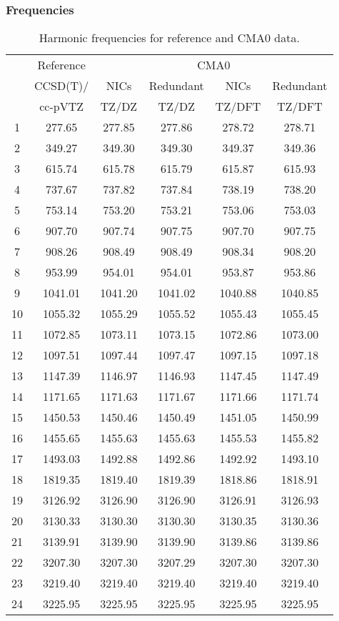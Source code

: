 \documentclass[10pt,oneside]{article}
\begin{document}
\begin{table}[h!]
\subsubsection*{Frequencies}
\centering
\caption{Harmonic frequencies for reference and CMA0 data.}
\begin{tabular}{cccccc}
\toprule
{} & Reference & \multicolumn{4}{c}{CMA0} \\
{} &  CCSD(T)/ &    NICs &  Redundant &    NICs & Redundant \\
{} &   cc-pVTZ &   TZ/DZ &      TZ/DZ &  TZ/DFT &    TZ/DFT \\
\midrule
1  &    277.65 &  277.85 &     277.86 &  278.72 &    278.71 \\
2  &    349.27 &  349.30 &     349.30 &  349.37 &    349.36 \\
3  &    615.74 &  615.78 &     615.79 &  615.87 &    615.93 \\
4  &    737.67 &  737.82 &     737.84 &  738.19 &    738.20 \\
5  &    753.14 &  753.20 &     753.21 &  753.06 &    753.03 \\
6  &    907.70 &  907.74 &     907.75 &  907.70 &    907.75 \\
7  &    908.26 &  908.49 &     908.49 &  908.34 &    908.20 \\
8  &    953.99 &  954.01 &     954.01 &  953.87 &    953.86 \\
9  &   1041.01 & 1041.20 &    1041.02 & 1040.88 &   1040.85 \\
10 &   1055.32 & 1055.29 &    1055.52 & 1055.43 &   1055.45 \\
11 &   1072.85 & 1073.11 &    1073.15 & 1072.86 &   1073.00 \\
12 &   1097.51 & 1097.44 &    1097.47 & 1097.15 &   1097.18 \\
13 &   1147.39 & 1146.97 &    1146.93 & 1147.45 &   1147.49 \\
14 &   1171.65 & 1171.63 &    1171.67 & 1171.66 &   1171.74 \\
15 &   1450.53 & 1450.46 &    1450.49 & 1451.05 &   1450.99 \\
16 &   1455.65 & 1455.63 &    1455.63 & 1455.53 &   1455.82 \\
17 &   1493.03 & 1492.88 &    1492.86 & 1492.92 &   1493.10 \\
18 &   1819.35 & 1819.40 &    1819.39 & 1818.86 &   1818.91 \\
19 &   3126.92 & 3126.90 &    3126.90 & 3126.91 &   3126.93 \\
20 &   3130.33 & 3130.30 &    3130.30 & 3130.35 &   3130.36 \\
21 &   3139.91 & 3139.90 &    3139.90 & 3139.86 &   3139.86 \\
22 &   3207.30 & 3207.30 &    3207.29 & 3207.30 &   3207.30 \\
23 &   3219.40 & 3219.40 &    3219.40 & 3219.40 &   3219.40 \\
24 &   3225.95 & 3225.95 &    3225.95 & 3225.95 &   3225.95 \\
\bottomrule
\end{tabular}
\end{table}
\end{document}
